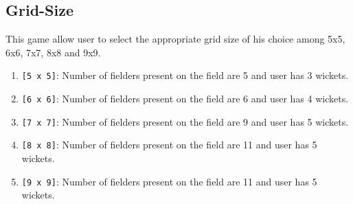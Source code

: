 \documentclass{article}
\begin{document}
\subsection{Grid-Size}
This game allow user to select the appropriate grid size of his choice among 5x5, 6x6, 7x7, 8x8 and 9x9. \autocite{1}
\begin{enumerate}
\item \texttt{[5 x 5]}: Number of fielders present on the field are 5 and user has 3 wickets.
\item \texttt{[6 x 6]}: Number of fielders present on the field are 6 and user has 4 wickets.
\item \texttt{[7 x 7]}: Number of fielders present on the field are 9 and user has 5 wickets.
\item \texttt{[8 x 8]}: Number of fielders present on the field are 11 and user has 5 wickets.
\item \texttt{[9 x 9]}: Number of fielders present on the field are 11 and user has 5 wickets.
\end{enumerate}
\end{document}
